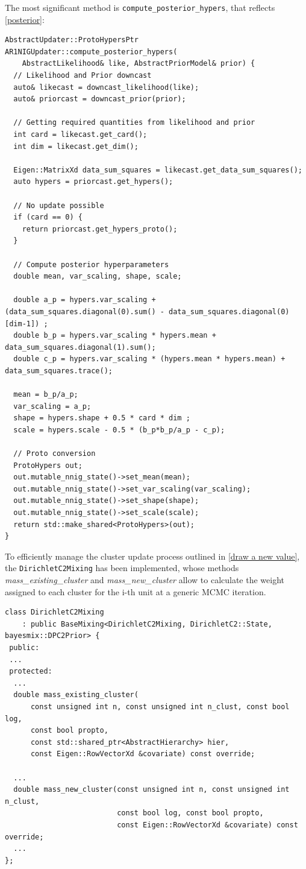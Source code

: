\documentclass[12pt,a4paper]{article}
\begin{document}
 The most significant method is \texttt{compute\_posterior\_hypers}, that reflects \autoref{posterior}:
\begin{lstlisting} 
AbstractUpdater::ProtoHypersPtr AR1NIGUpdater::compute_posterior_hypers(
    AbstractLikelihood& like, AbstractPriorModel& prior) {
  // Likelihood and Prior downcast
  auto& likecast = downcast_likelihood(like);
  auto& priorcast = downcast_prior(prior);

  // Getting required quantities from likelihood and prior
  int card = likecast.get_card();
  int dim = likecast.get_dim();

  Eigen::MatrixXd data_sum_squares = likecast.get_data_sum_squares();
  auto hypers = priorcast.get_hypers();

  // No update possible
  if (card == 0) {
    return priorcast.get_hypers_proto();
  }

  // Compute posterior hyperparameters
  double mean, var_scaling, shape, scale;
  
  double a_p = hypers.var_scaling + (data_sum_squares.diagonal(0).sum() - data_sum_squares.diagonal(0)[dim-1]) ;
  double b_p = hypers.var_scaling * hypers.mean + data_sum_squares.diagonal(1).sum();
  double c_p = hypers.var_scaling * (hypers.mean * hypers.mean) + data_sum_squares.trace();

  mean = b_p/a_p;
  var_scaling = a_p;
  shape = hypers.shape + 0.5 * card * dim ;
  scale = hypers.scale - 0.5 * (b_p*b_p/a_p - c_p);

  // Proto conversion
  ProtoHypers out;
  out.mutable_nnig_state()->set_mean(mean);
  out.mutable_nnig_state()->set_var_scaling(var_scaling);
  out.mutable_nnig_state()->set_shape(shape);
  out.mutable_nnig_state()->set_scale(scale);
  return std::make_shared<ProtoHypers>(out);
}

 \end{lstlisting}
 
To efficiently manage the cluster update process outlined in \autoref{draw a new value}, the \newline
\texttt{DirichletC2Mixing} has been implemented, whose methods \textit{mass\_existing\_cluster} and \textit{mass\_new\_cluster} allow to calculate the weight assigned to each cluster for the i-th unit at a generic MCMC iteration. 
\begin{lstlisting} 
class DirichletC2Mixing
    : public BaseMixing<DirichletC2Mixing, DirichletC2::State, bayesmix::DPC2Prior> {
 public:
 ...
 protected:
  ...
  double mass_existing_cluster(
      const unsigned int n, const unsigned int n_clust, const bool log,
      const bool propto,
      const std::shared_ptr<AbstractHierarchy> hier,
      const Eigen::RowVectorXd &covariate) const override;

  ...
  double mass_new_cluster(const unsigned int n, const unsigned int n_clust,
                          const bool log, const bool propto,
                          const Eigen::RowVectorXd &covariate) const override;
  ...
};
\end{lstlisting}
\end{document}
